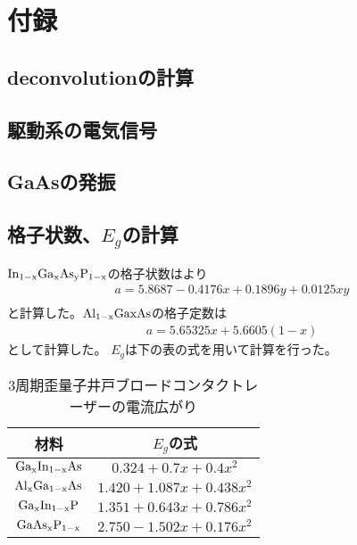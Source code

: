 
\chapter{付録}

\section{deconvolutionの計算}
\section{駆動系の電気信号}
\section{GaAsの発振}
\section{格子状数、$E_{g}$の計算}
$\rm{In_{1-x}Ga_{x}As_{y}P_{1-x}}$の格子状数は\cite{ref_iga}より
\begin{eqnarray}
a=5.8687-0.4176x+0.1896y+0.0125xy\\
\end{eqnarray}
と計算した。$\rm{Al_{1-x}Ga{x}As}$の格子定数は
\begin{eqnarray}
a=5.65325x+5.6605(1-x)
\end{eqnarray}
として計算した。
$E_{g}$は下の表の式を用いて計算を行った。
\begin{table}[h]
  \caption{3周期歪量子井戸ブロードコンタクトレーザーの電流広がり}
  \label{table:table_Eg}
  \centering
  \begin{tabular}{cc}
    \hline
    材料& $E_{g}$の式   \\
    \hline \hline
     $\rm{Ga_{x}In_{1-x}As}$ &$0.324+0.7x+0.4x^2$   \\
    $\rm{Al_{x}Ga_{1-x}As}$& $1.420+1.087x+0.438x^2$ \\
    $\rm{Ga_{x}In_{1-x}P}$& $1.351+0.643x+0.786x^2$ \\ 
    $\rm{GaAs_{x}P_{1-x}}$&$2.750-1.502x+0.176x^2$\\
    \hline
  \end{tabular}
\end{table}

